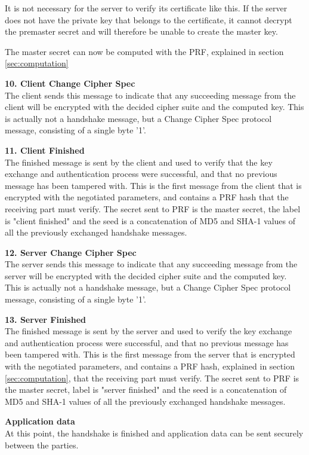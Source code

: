 \documentclass[12pt,a4paper,titlepage]{report}
\begin{document}
It is not necessary for the server to verify its certificate like this. If the server does not have the private key that belongs to the certificate, it cannot decrypt the premaster secret and will therefore be unable to create the master key.
 
The master secret can now be computed with the PRF, explained in section \ref{sec:computation}

\textbf{10. Client Change Cipher Spec}\\
The client sends this message to indicate that any succeeding message from the client will be encrypted with the decided cipher suite and the computed key. This is actually not a handshake message, but a Change Cipher Spec protocol message, consisting of a single byte '1'.

\textbf{11. Client Finished}\\
The finished message is sent by the client and used to verify that the key exchange and authentication process were successful, and that no previous message has been tampered with. This is the first message from the client that is encrypted with the negotiated parameters, and contains a PRF hash that the receiving part must verify. The secret sent to PRF is the master secret, the label is "client finished" and the seed is a concatenation of MD5 and SHA-1 values of all the previously exchanged handshake messages.

\textbf{12. Server Change Cipher Spec}\\
The server sends this message to indicate that any succeeding message from the server will be encrypted with the decided cipher suite and the computed key. This is actually not a handshake message, but a Change Cipher Spec protocol message, consisting of a single byte '1'.

\textbf{13. Server Finished}\\
The finished message is sent by the server and used to verify the key exchange and authentication process were successful, and that no previous message has been tampered with. This is the first message from the server that is encrypted with the negotiated parameters, and contains a PRF hash, explained in section \ref{sec:computation}, that the receiving part must verify. The secret sent to PRF is the master secret, label is "server finished" and the seed is a concatenation of MD5 and SHA-1 values of all the previously exchanged handshake messages.

\textbf{Application data}\\
At this point, the handshake is finished and application data can be sent securely between the parties.
\end{document}

